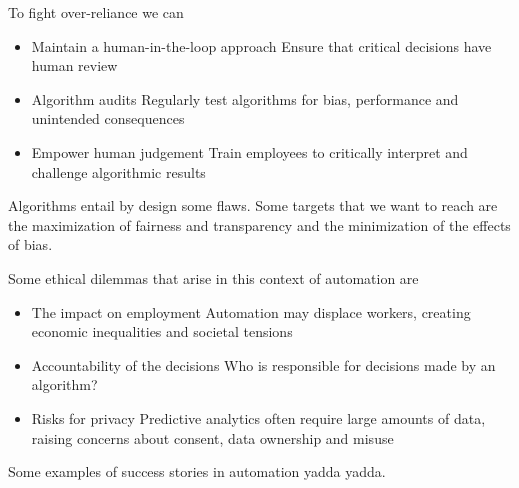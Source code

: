 To fight over-reliance we can
\begin{itemize}
    \item Maintain a human-in-the-loop approach \ra Ensure that critical decisions have human review
    \item Algorithm audits \ra Regularly test algorithms for bias, performance and unintended consequences
    \item Empower human judgement \ra Train employees to critically interpret and challenge algorithmic results
\end{itemize}

Algorithms entail by design some flaws. Some targets that we want to reach are the maximization of fairness and transparency and the minimization of the effects of bias.

\vspace{10pt}

Some ethical dilemmas that arise in this context of automation are
\begin{itemize}
    \item The impact on employment \ra Automation may displace workers, creating economic inequalities and societal tensions
    \item Accountability of the decisions \ra Who is responsible for decisions made by an algorithm?
    \item Risks for privacy \ra Predictive analytics often require large amounts of data, raising concerns about consent, data ownership and misuse
\end{itemize}

Some examples of success  stories in automation yadda yadda.

\vspace{10pt}

